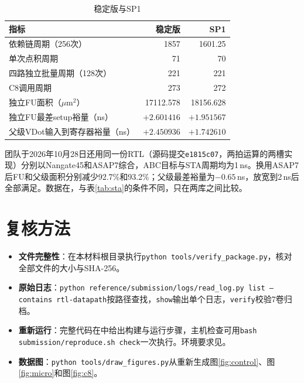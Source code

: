 \begin{table}[!htbp]\centering\small
\caption{稳定版与SP1}\label{tab:sp1}
\begin{tabular}{lrr}
\toprule
指标 & 稳定版 & SP1\\
\midrule
依赖链周期（256次） & 1857 & 1601.25\\
单次点积周期 & 71 & 70\\
四路独立批量周期（128次） & 221 & 221\\
C8调用周期 & 273 & 272\\
独立FU面积（$\mu\mathrm{m}^2$） & 17112.578 & 18156.628\\
独立FU最差setup裕量（ns） & $+2.601416$ & $+1.951567$\\
父级VDot输入到寄存器裕量（ns） & $+2.450936$ & $+1.742610$\\
\bottomrule
\end{tabular}
\end{table}

团队于2026年10月28日还用同一份RTL（源码提交\texttt{e1815c07}，两拍运算的两槽实现）分别以Nangate45和ASAP7综合，ABC目标与STA周期均为1\,ns。换用ASAP7后FU和父级面积分别减少92.7\%和93.2\%；父级最差裕量为$-0.65$\,ns，放宽到2\,ns后全部满足。数据在，与表\ref{tab:sta}的条件不同，只在两库之间比较。

\section{复核方法}

{\raggedright
\begin{itemize}
\item \textbf{文件完整性}：在本材料根目录执行\texttt{python tools/verify\_package.py}，核对全部文件的大小与SHA-256。
\item \textbf{原始日志}：\texttt{python reference/submission/logs/read\_log.py list --contains rtl-datapath}按路径查找，\texttt{show}输出单个日志，\texttt{verify}校验7卷归档。
\item \textbf{重新运行}：完整代码在中给出构建与运行步骤，主机检查可用\texttt{bash submission/reproduce.sh check}一次执行。环境要求见。
\item \textbf{数据图}：\texttt{python tools/draw\_figures.py}从重新生成图\ref{fig:control}、图\ref{fig:micro}和图\ref{fig:c8}。
\end{itemize}\par}

